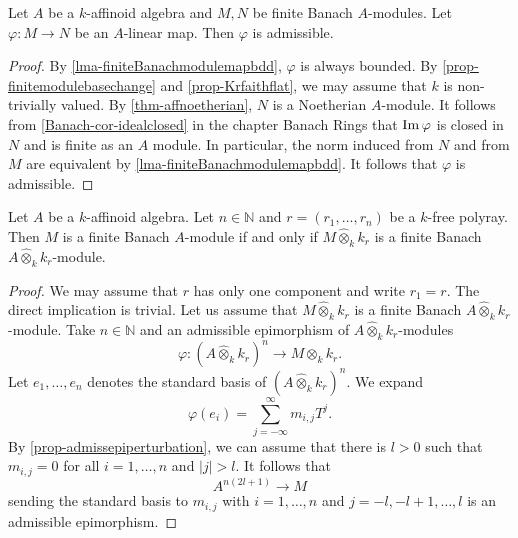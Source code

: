\begin{proposition}\label{prop-finitemodulemapadmi}
    Let $A$ be a $k$-affinoid algebra and $M,N$ be finite Banach $A$-modules. Let $\varphi:M\rightarrow N$ be an $A$-linear map. Then $\varphi$ is admissible.
\end{proposition}
\begin{proof}
    By \cref{lma-finiteBanachmodulemapbdd}, $\varphi$ is always bounded.
    By \cref{prop-finitemodulebasechange} and \cref{prop-Krfaithflat}, we may assume that $k$ is non-trivially valued. By \cref{thm-affnoetherian}, $N$ is a Noetherian $A$-module. It follows from \cref{Banach-cor-idealclosed} in the chapter Banach Rings that $\operatorname{Im} \varphi$ is closed in $N$ and is finite as an $A$ module. In particular, the norm induced from $N$ and from $M$ are equivalent by \cref{lma-finiteBanachmodulemapbdd}. It follows that $\varphi$ is admissible.
\end{proof}

\begin{proposition}\label{prop-finitenessdescent1}
    Let $A$ be a $k$-affinoid algebra. Let $n\in \mathbb{N}$ and $r=(r_1,\ldots,r_n)$ be a $k$-free polyray. Then $M$ is a finite Banach $A$-module if and only if $M\hat{\otimes}_k k_r$ is a finite Banach $A\hat{\otimes}_k k_r$-module.
\end{proposition}
\begin{proof}
    We may assume that $r$ has only one component and write $r_1=r$. The direct implication is trivial. Let us assume that $M\hat{\otimes}_k k_r$ is a finite Banach $A\hat{\otimes}_k k_r$-module. Take $n\in \mathbb{N}$ and an admissible epimorphism of $A\hat{\otimes}_k k_r$-modules
    \[
        \varphi:  (A\hat{\otimes}_k k_r)^n\rightarrow M\hat{\otimes}_k k_r.
    \]
    Let $e_1,\ldots,e_n$ denotes the standard basis of $(A\hat{\otimes}_k k_r)^n$. We expand
    \[
        \varphi(e_i)=\sum_{j=-\infty}^{\infty} m_{i,j}T^j.  
    \]
    By \cref{prop-admissepiperturbation}, we can assume that there is $l>0$ such that $m_{i,j}=0$ for all $i=1,\ldots,n$ and $|j|>l$. It follows that 
    \[
        A^{n(2l+1)}\rightarrow M  
    \]
    sending the standard basis to $m_{i,j}$ with $i=1,\ldots,n$ and $j=-l,-l+1,\ldots,l$ is an admissible epimorphism.
\end{proof}



